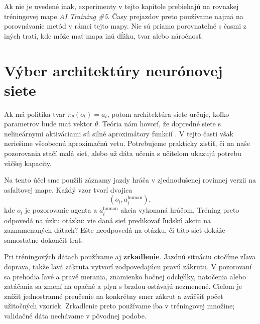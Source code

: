 Ak nie je uvedené inak, experimenty v tejto kapitole prebiehajú na rovnakej tréningovej mape \textit{AI Training \#5}. Časy prejazdov preto používame najmä na porovnávanie metód v rámci tejto mapy. Nie sú priamo porovnateľné s časmi z iných tratí, kde môže mať mapa inú dĺžku, tvar alebo náročnosť.

\section{Výber architektúry neurónovej siete}

Ak má politika tvar \(\pi_{\theta}(o_t)=a_t\), potom architektúra siete určuje, koľko parametrov bude mať vektor \(\theta\). Teória nám hovorí, že dopredné siete s nelineárnymi aktiváciami sú silné aproximátory funkcií \cite{cybenko1989approximation,goodfellow2016deep}. V tejto časti však neriešime všeobecnú aproximačnú vetu. Potrebujeme prakticky zistiť, či na naše pozorovania stačí malá sieť, alebo už dáta učenia s učiteľom ukazujú potrebu väčšej kapacity.

Na tento účel sme použili záznamy jazdy hráča v zjednodušenej rovinnej verzii \Trackmania{} na asfaltovej mape. Každý vzor tvorí dvojica
\[
    (o_i, a_i^{\mathrm{human}}),
\]
kde \(o_i\) je pozorovanie agenta a \(a_i^{\mathrm{human}}\) akcia vykonaná hráčom. Tréning preto odpovedá na úzku otázku: vie daná sieť predikovať ľudskú akciu na zaznamenaných dátach? Ešte neodpovedá na otázku, či táto sieť dokáže samostatne dokončiť trať.

Pri tréningových dátach používame aj \textbf{zrkadlenie}. Jazdnú situáciu otočíme zľava doprava, takže ľavá zákruta vytvorí zodpovedajúcu pravú zákrutu. V pozorovaní sa prehodia ľavé a pravé merania, znamienko bočnej odchýlky, natočenia alebo zatáčania sa zmení na opačné a plyn s brzdou ostávajú nezmenené. Cieľom je znížiť jednostranné preučenie na konkrétny smer zákrut a zväčšiť počet užitočných vzoriek. Zrkadlenie preto používame iba v tréningovej množine; validačné dáta nechávame v pôvodnej podobe.

